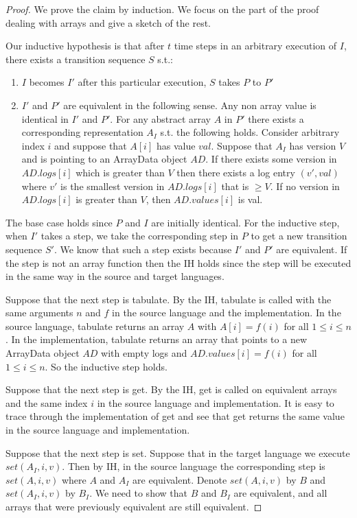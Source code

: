 \documentclass[preprint]{sigplanconf}
\begin{document}
\begin{proof}
We prove the claim by induction. We focus on the part of the proof dealing with arrays and give a sketch of the rest.

Our inductive hypothesis is that after $t$ time steps in an arbitrary execution of $I$, there exists a transition sequence $S$ s.t.:
\begin{enumerate}
\item $I$ becomes $I'$ after this particular execution, $S$ takes $P$ to $P'$
\item $I'$ and $P'$ are equivalent in the following sense. Any non array value is identical in $I'$ and $P'$. For any abstract array $A$ in $P'$ there exists a corresponding representation $A_I$ s.t. the following holds. Consider arbitrary index $i$ and suppose that $A[i]$ has value $val$. Suppose that $A_I$ has version $V$ and is pointing to an ArrayData object $AD$. If there exists some version in $AD.logs[i]$ which is greater than $V$ then there exists a log entry $(v', val)$ where $v'$ is the smallest version in $AD.logs[i]$ that is $\geq V$. If no version in $AD.logs[i]$ is greater than $V$, then $AD.values[i]$ is val.
\end{enumerate}

The base case holds since $P$ and $I$ are initially identical. For the inductive step, when $I'$ takes a step, we take the corresponding step in $P$ to get a new transition sequence $S'$. We know that such a step exists because $I'$ and $P'$ are equivalent. If the step is not an array function then the IH holds since the step will be executed in the same way in the source and target languages.

Suppose that the next step is tabulate. By the IH, tabulate is called with the same arguments $n$ and $f$ in the source language and the implementation. In the source language, tabulate returns an array $A$ with $A[i] = f(i)$ for all $1 \leq i \leq n$. In the implementation, tabulate returns an array that points to a new ArrayData object $AD$ with empty logs and $AD.values[i] = f(i)$ for all $1 \leq i \leq n$. So the inductive step holds.

Suppose that the next step is get. By the IH, get is called on equivalent arrays and the same index $i$ in the source language and implementation. It is easy to trace through the implementation of get and see that get returns the same value in the source language and implementation.

Suppose that the next step is set. Suppose that in the target language we execute $set(A_I, i, v)$. Then by IH, in the source language the corresponding step is $set(A, i, v)$ where $A$ and $A_I$ are equivalent. Denote $set(A, i, v)$ by $B$ and $set(A_I, i, v)$ by $B_I$. We need to show that $B$ and $B_I$ are equivalent, and all arrays that were previously equivalent are still equivalent.


\end{proof}
\end{document}
